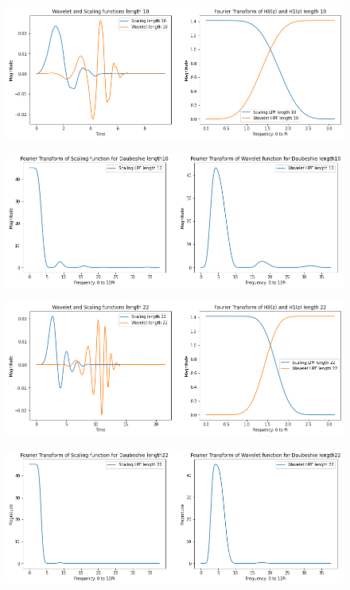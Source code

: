 \documentclass{article}
\begin{document}
\begin{figure}[H]
\begin{center}
\includegraphics[scale = 0.5]{10.png}
\end{center}
\end{figure}

\begin{figure}[H]
\begin{center}
\includegraphics[scale = 0.5]{10f.png}
\end{center}
\end{figure}

\begin{figure}[H]
\begin{center}
\includegraphics[scale = 0.5]{22.png}
\end{center}
\end{figure}

\begin{figure}[H]
\begin{center}
\includegraphics[scale = 0.5]{22f.png}
\end{center}
\end{figure}
\end{document}
